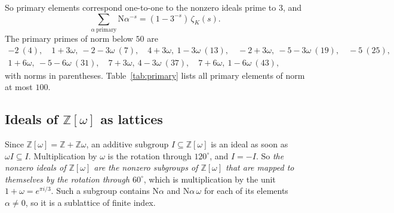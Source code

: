\documentclass[11pt]{article}
\numberwithin{equation}{section}
\newcommand{\N}{\mathrm N}
\newcommand{\OO}{\mathbb Z[\omega]}
\newcommand{\Z}{\mathbb Z}
\theoremstyle{definition}
\theoremstyle{remark}
\begin{document}
So primary elements correspond one-to-one to the nonzero ideals prime to $3$, and
\begin{equation}\label{eq:primaryzeta}
 \sum_{\alpha\ \mathrm{primary}}\N\alpha^{-s}=(1-3^{-s})\,\zeta_K(s).
\end{equation}
The primary primes of norm below $50$ are
\begin{equation}\label{eq:smallprimes}
\begin{gathered}
 -2\ (4),\quad 1+3\omega,\ -2-3\omega\ (7),\quad 4+3\omega,\ 1-3\omega\ (13),\quad
 -2+3\omega,\ -5-3\omega\ (19),\quad -5\ (25),\\
 1+6\omega,\ -5-6\omega\ (31),\quad 7+3\omega,\ 4-3\omega\ (37),\quad 7+6\omega,\ 1-6\omega\ (43),
\end{gathered}
\end{equation}
with norms in parentheses. Table~\ref{tab:primary} lists all primary elements of norm at most $100$.

\subsection{Ideals of \texorpdfstring{$\OO$}{Z[omega]} as lattices}\label{sec:ideals}
Since $\OO=\Z+\Z\omega$, an additive subgroup $I\subseteq\OO$ is an ideal as soon as $\omega I\subseteq I$.
Multiplication by $\omega$ is the rotation through $120^\circ$, and $I=-I$. So \emph{the nonzero ideals of
$\OO$ are the nonzero subgroups of $\OO$ that are mapped to themselves by the rotation through $60^\circ$},
which is multiplication by the unit $1+\omega=e^{\pi i/3}$. Such a subgroup contains $\N\alpha$ and
$\N\alpha\,\omega$ for each of its elements $\alpha\ne0$, so it is a sublattice of finite index.
\end{document}
